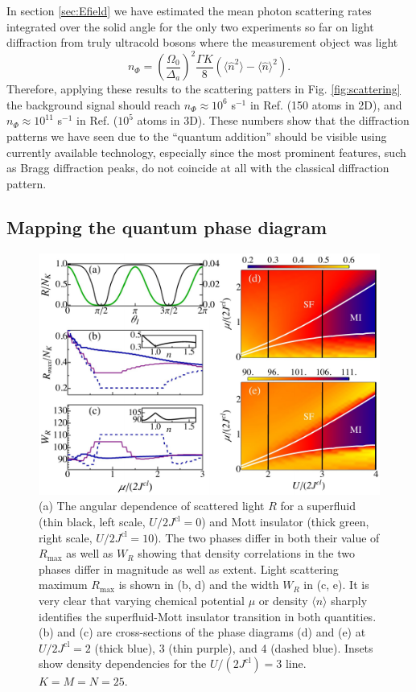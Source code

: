 In section \ref{sec:Efield} we have estimated the mean photon
scattering rates integrated over the solid angle for the only two
experiments so far on light diffraction from truly ultracold bosons
where the measurement object was light
\begin{equation} 
  n_{\Phi}= \left(\frac{\Omega_0}{\Delta_a}\right)^2 \frac{\Gamma K}{8}
  (\langle\hat{n}^2\rangle-\langle\hat{n}\rangle^2).
\end{equation} 
Therefore, applying these results to the scattering patters in
Fig. \ref{fig:scattering} the background signal should reach
$n_\Phi \approx 10^6$ s$^{-1}$ in Ref. \cite{weitenberg2011} (150
atoms in 2D), and $n_\Phi \approx 10^{11}$ s$^{-1}$ in
Ref. \cite{miyake2011} ($10^5$ atoms in 3D). These numbers show that
the diffraction patterns we have seen due to the ``quantum addition''
should be visible using currently available technology, especially
since the most prominent features, such as Bragg diffraction peaks, do
not coincide at all with the classical diffraction pattern.

\subsection{Mapping the quantum phase diagram}

\begin{figure}[htbp!]  
  \centering
  \includegraphics[width=\linewidth]{oph11}
  \caption[Mapping the Bose-Hubbard Phase Diagram]{(a) The angular
    dependence of scattered light $R$ for a superfluid (thin black,
    left scale, $U/2J^\text{cl} = 0$) and Mott insulator (thick green,
    right scale, $U/2J^\text{cl} =10$). The two phases differ in both
    their value of $R_\text{max}$ as well as $W_R$ showing that
    density correlations in the two phases differ in magnitude as well
    as extent. Light scattering maximum $R_\text{max}$ is shown in (b,
    d) and the width $W_R$ in (c, e).  It is very clear that varying
    chemical potential $\mu$ or density $\langle n\rangle$ sharply
    identifies the superfluid-Mott insulator transition in both
    quantities. (b) and (c) are cross-sections of the phase diagrams
    (d) and (e) at $U/2J^\text{cl}=2$ (thick blue), 3 (thin purple),
    and 4 (dashed blue). Insets show density dependencies for the
    $U/(2 J^\text{cl}) = 3$ line. $K=M=N=25$.}
	\label{fig:SFMI}
\end{figure}

